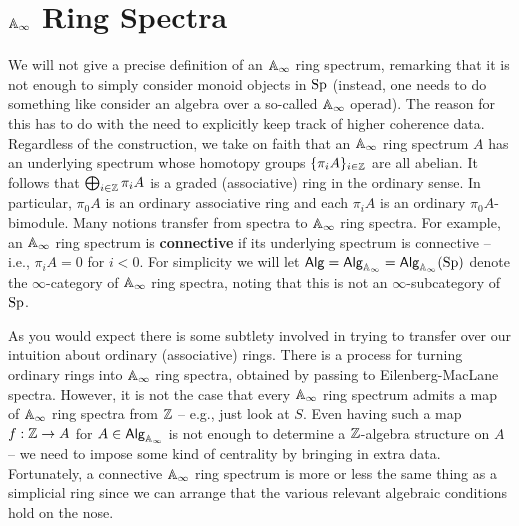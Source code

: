 \documentclass[11pt]{article}
\begin{document}
\section{$\mathbb{A}_{\infty}$ Ring Spectra}
We will not give a precise definition of an $\mathbb{A}_{\infty}$ ring spectrum, remarking that it is not enough to simply consider monoid objects in $\textup{Sp}$ (instead, one needs to do something like consider an algebra over a so-called $\mathbb{A}_{\infty}$ operad). The reason for this has to do with the need to explicitly keep track of higher coherence data. Regardless of the construction, we take on faith that an $\mathbb{A}_{\infty}$ ring spectrum $A$ has an underlying spectrum whose homotopy groups $\{\pi_iA\}_{i\in\mathbb{Z}}$ are all abelian. It follows that $\bigoplus_{i\in\mathbb{Z}}\pi_iA$ is a graded (associative) ring in the ordinary sense. In particular, $\pi_0A$ is an ordinary associative ring and each $\pi_iA$ is an ordinary $\pi_0A$-bimodule. Many notions transfer from spectra to $\mathbb{A}_{\infty}$ ring spectra. For example, an $\mathbb{A}_{\infty}$ ring spectrum is \textbf{connective} if its underlying spectrum is connective -- i.e., $\pi_iA=0$ for $i<0$. For simplicity we will let $\operatorname{\mathsf{Alg}}=\operatorname{\mathsf{Alg}}_{\mathbb{A}_{\infty}}=\operatorname{\mathsf{Alg}}_{\mathbb{A}_{\infty}}(\textup{Sp})$ denote the $\infty$-category of $\mathbb{A}_{\infty}$ ring spectra, noting that this is not an $\infty$-subcategory of $\textup{Sp}$.

As you would expect there is some subtlety involved in trying to transfer over our intuition about ordinary (associative) rings. There is a process for turning ordinary rings into $\mathbb{A}_{\infty}$ ring spectra, obtained by passing to Eilenberg-MacLane spectra. However, it is not the case that every $\mathbb{A}_{\infty}$ ring spectrum admits a map of $\mathbb{A}_{\infty}$ ring spectra from $\mathbb{Z}$ -- e.g., just look at $S$. Even having such a map $f: \mathbb{Z}\to A$ for $A\in\operatorname{\mathsf{Alg}}_{\mathbb{A}_{\infty}}$ is not enough to determine a $\mathbb{Z}$-algebra structure on $A$ -- we need to impose some kind of centrality by bringing in extra data. Fortunately, a connective $\mathbb{A}_{\infty}$ ring spectrum is more or less the same thing as a simplicial ring since we can arrange that the various relevant algebraic conditions hold on the nose. 
\end{document}
